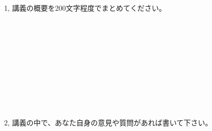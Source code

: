 \documentclass[a4paper,10pt,fleqn]{jsarticle}
\begin{document}
1, 講義の概要を200文字程度でまとめてください。
\begin{screen}
　　\\
　　\\
　　\\
　　\\
　　\\
　　\\
　　\\
　　\\
\end{screen} \\

2, 講義の中で、あなた自身の意見や質問があれば書いて下さい。
\begin{screen}
　　\\
　　\\
　　\\
　　\\
　　\\
　　\\
　　\\
　　\\
\end{screen}

\vspace{-50mm}
\end{document}
